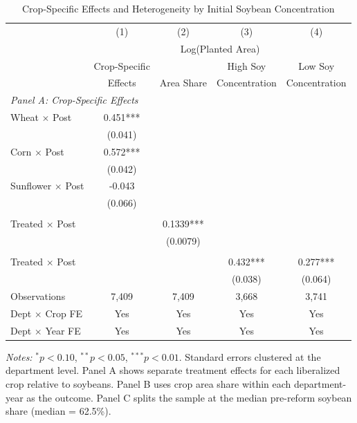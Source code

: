 \begin{table}[H]
\centering
\caption{Crop-Specific Effects and Heterogeneity by Initial Soybean Concentration}
\label{tab:heterogeneity}
\begin{threeparttable}
\begin{tabular}{lcccc}
\toprule
 & (1) & (2) & (3) & (4) \\
 & \multicolumn{4}{c}{Log(Planted Area)} \\
 & Crop-Specific & & High Soy & Low Soy \\
 & Effects & Area Share & Concentration & Concentration \\
\midrule
\multicolumn{5}{l}{\textit{Panel A: Crop-Specific Effects}} \\
Wheat $\times$ Post & 0.451*** & & & \\
 & (0.041) & & & \\
Corn $\times$ Post & 0.572*** & & & \\
 & (0.042) & & & \\
Sunflower $\times$ Post & -0.043 & & & \\
 & (0.066) & & & \\
\addlinespace
\multicolumn{5}{l}{\textit{Panel B: Area Share Outcome}} \\
Treated $\times$ Post & & 0.1339*** & & \\
 & & (0.0079) & & \\
\addlinespace
\multicolumn{5}{l}{\textit{Panel C: Heterogeneity by Pre-Reform Soybean Share}} \\
Treated $\times$ Post & & & 0.432*** & 0.277*** \\
 & & & (0.038) & (0.064) \\
\addlinespace
Observations & 7,409 & 7,409 & 3,668 & 3,741 \\
Dept $\times$ Crop FE & Yes & Yes & Yes & Yes \\
Dept $\times$ Year FE & Yes & Yes & Yes & Yes \\
\bottomrule
\end{tabular}
\begin{tablenotes}[flushleft]
\small
\item \textit{Notes:} $^{*}p<0.10$, $^{**}p<0.05$, $^{***}p<0.01$. Standard errors clustered at the department level. Panel A shows separate treatment effects for each liberalized crop relative to soybeans. Panel B uses crop area share within each department-year as the outcome. Panel C splits the sample at the median pre-reform soybean share (median = 62.5\%).
\end{tablenotes}
\end{threeparttable}
\end{table}

